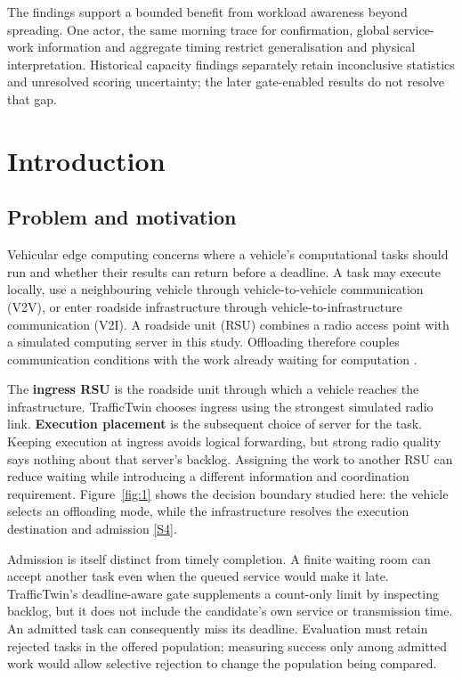 \documentclass[11pt,a4paper]{article}
\begin{document}
The findings support a bounded benefit from workload awareness beyond spreading. One actor, the same morning trace for confirmation, global service-work information and aggregate timing restrict generalisation and physical interpretation. Historical capacity findings separately retain inconclusive statistics and unresolved scoring uncertainty; the later gate-enabled results do not resolve that gap.

\section{Introduction}\label{sec:1}

\subsection{Problem and motivation}\label{sec:1.1}

Vehicular edge computing concerns where a vehicle's computational tasks should run and whether their results can return before a deadline. A task may execute locally, use a neighbouring vehicle through vehicle-to-vehicle communication (V2V), or enter roadside infrastructure through vehicle-to-infrastructure communication (V2I). A roadside unit (RSU) combines a radio access point with a simulated computing server in this study. Offloading therefore couples communication conditions with the work already waiting for computation \cite{ref1}.

The \textbf{ingress RSU} is the roadside unit through which a vehicle reaches the infrastructure. TrafficTwin chooses ingress using the strongest simulated radio link. \textbf{Execution placement} is the subsequent choice of server for the task. Keeping execution at ingress avoids logical forwarding, but strong radio quality says nothing about that server's backlog. Assigning the work to another RSU can reduce waiting while introducing a different information and coordination requirement. Figure~\ref{fig:1} shows the decision boundary studied here: the vehicle selects an offloading mode, while the infrastructure resolves the execution destination and admission \hyperref[source-s4]{[S4]}.

Admission is itself distinct from timely completion. A finite waiting room can accept another task even when the queued service would make it late. TrafficTwin's deadline-aware gate supplements a count-only limit by inspecting backlog, but it does not include the candidate's own service or transmission time. An admitted task can consequently miss its deadline. Evaluation must retain rejected tasks in the offered population; measuring success only among admitted work would allow selective rejection to change the population being compared.
\end{document}
